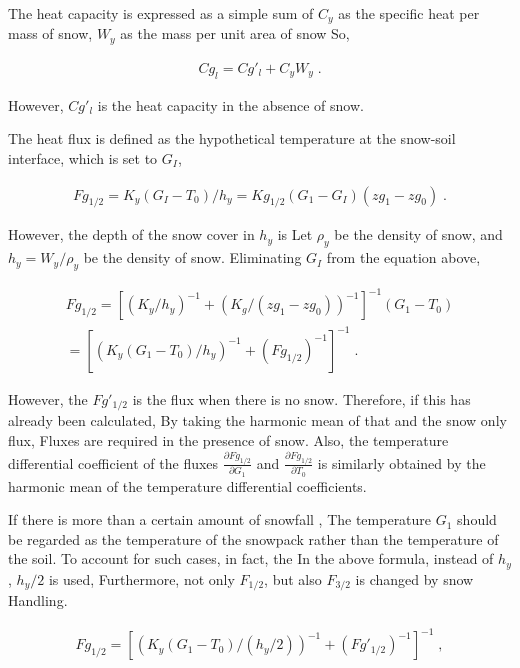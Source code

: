 The heat capacity is expressed as a simple sum of \(C_y\) as the
specific heat per mass of snow, \(W_y\) as the mass per unit area of
snow So,

\begin{eqnarray}
  Cg_{l} = Cg'_{l} + C_y W_y \; .
\end{eqnarray}

However, \(Cg'_{l}\) is the heat capacity in the absence of snow.

The heat flux is defined as the hypothetical temperature at the
snow-soil interface, which is set to \(G_I\),

\begin{eqnarray}
  Fg_{1/2} = K_y (G_I-T_0)/h_y = Kg_{1/2} (G_1 - G_I)(zg_1 - zg_0) \; .
\end{eqnarray}

However, the depth of the snow cover in \(h_y\) is Let \(\rho_y\) be the
density of snow, and \(h_y = W_y/\rho_y\) be the density of snow.
Eliminating \(G_I\) from the equation above,

\begin{eqnarray}
  Fg_{1/2}  = \left[ \left( K_y/h_y \right)^{-1} 
                   +  \left( K_g /(zg_1 - zg_0) \right)^{-1} 
              \right]^{-1} (G_1-T_0)
                    \\
            = \left[ \left( K_y (G_1-T_0)/h_y \right)^{-1} 
                    +  (Fg_{1/2})^{-1}
                \right]^{-1} \; .
\end{eqnarray}

However, the \(Fg'_{1/2}\) is the flux when there is no snow. Therefore,
if this has already been calculated, By taking the harmonic mean of that
and the snow only flux, Fluxes are required in the presence of snow.
Also, the temperature differential coefficient of the fluxes
\(\frac{\partial Fg_{1/2}}{\partial G_1}\) and
\(\frac{\partial Fg_{1/2}}{\partial T_0}\) is similarly obtained by the
harmonic mean of the temperature differential coefficients.

If there is more than a certain amount of snowfall , The temperature
\(G_1\) should be regarded as the temperature of the snowpack rather
than the temperature of the soil. To account for such cases, in fact,
the In the above formula, instead of \(h_y\), \(h_y/2\) is used,
Furthermore, not only \(F_{1/2}\), but also \(F_{3/2}\) is changed by
snow Handling.

\begin{eqnarray}
  Fg_{1/2} = \left[ \left( K_y (G_1-T_0)/(h_y/2) \right)^{-1} 
                    +  (Fg'_{1/2})^{-1}
                \right]^{-1} \; ,
\end{eqnarray}

